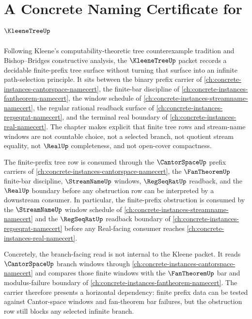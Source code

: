 \chapter{A Concrete Naming Certificate for $\KleeneTreeUp$}
\label{ch:concrete-instances-kleene-tree-namecert}

Following Kleene's computability-theoretic tree counterexample tradition and Bishop--Bridges constructive analysis, the $\KleeneTreeUp$ packet records a decidable finite-prefix tree surface without turning that surface into an infinite path-selection principle. It sits between the binary prefix carrier of \autoref{ch:concrete-instances-cantorspace-namecert}, the finite-bar discipline of \autoref{ch:concrete-instances-fantheorem-namecert}, the window schedule of \autoref{ch:concrete-instances-streamname-namecert}, the regular rational readback surface of \autoref{ch:concrete-instances-regseqrat-namecert}, and the terminal real boundary of \autoref{ch:concrete-instances-real-namecert}. The chapter makes explicit that finite tree rows and stream-name windows are not countable choice, not a selected branch, not quotient stream equality, not $\RealUp$ completeness, and not open-cover compactness.

The finite-prefix tree row is consumed through the $\CantorSpaceUp$ prefix carriers of \autoref{ch:concrete-instances-cantorspace-namecert}, the $\FanTheoremUp$ finite-bar discipline, $\StreamNameUp$ windows, $\RegSeqRatUp$ readback, and the $\RealUp$ boundary before any obstruction row can be interpreted by a downstream consumer. In particular, the finite-prefix obstruction is consumed by the $\StreamNameUp$ window schedule of \autoref{ch:concrete-instances-streamname-namecert} and the $\RegSeqRatUp$ readback boundary of \autoref{ch:concrete-instances-regseqrat-namecert} before any Real-facing consumer reaches \autoref{ch:concrete-instances-real-namecert}.

Concretely, the branch-facing read is not internal to the Kleene packet. It reads $\CantorSpaceUp$ branch windows through \autoref{ch:concrete-instances-cantorspace-namecert} and compares those finite windows with the $\FanTheoremUp$ bar and modulus-failure boundary of \autoref{ch:concrete-instances-fantheorem-namecert}. The carrier therefore presents a horizontal dependency: finite prefix data can be tested against Cantor-space windows and fan-theorem bar failures, but the obstruction row still blocks any selected infinite branch.

